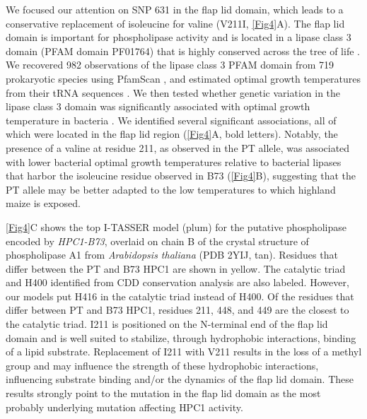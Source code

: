 \documentclass[9pt,twocolumn,twoside,lineno]{biorxiv}
\begin{document}
We focused our attention on SNP 631 in the flap lid domain, which leads to a conservative replacement of isoleucine for valine (V211I, \cref{Fig4}A).  
The flap lid domain is important for phospholipase activity and is located in a lipase class 3 domain (PFAM domain PF01764) that is highly conserved across the tree of life \cite{Jensen2021-zm}. 
We recovered 982 observations of the lipase class 3 PFAM domain from 719 prokaryotic species using PfamScan \cite{Potter2018-tk, El-Gebali2019-pw}, and estimated optimal growth temperatures from their tRNA sequences \cite{Cimen2020-dm}.
We then tested whether genetic variation in the lipase class 3 domain was significantly associated with optimal growth temperature in bacteria \cite{Jensen2021-iv}. 
We identified several significant associations, all of which were located in the flap lid region (\cref{Fig4}A, bold letters).  
Notably, the presence of a valine at residue 211, as observed in the PT allele, was associated with lower bacterial optimal growth temperatures relative to bacterial lipases that harbor the isoleucine residue observed in B73 (\cref{Fig4}B), suggesting that the PT allele may be better adapted to the low temperatures to which highland maize is exposed.

\cref{Fig4}C shows the top I-TASSER model (plum) for the putative phospholipase encoded by \textit{HPC1-B73}, overlaid on chain B of the crystal structure of phospholipase A1 from \textit{Arabidopsis thaliana} (PDB 2YIJ, tan). 
Residues that differ between the PT and B73 HPC1 are shown in yellow. 
The catalytic triad and H400 identified from CDD conservation analysis are also labeled.
However, our models put H416 in the catalytic triad instead of H400. 
Of the residues that differ between PT and B73 HPC1, residues 211, 448, and 449 are the closest to the catalytic triad. 
I211 is positioned on the N-terminal end of the flap lid domain and is well suited to stabilize, through hydrophobic interactions, binding of a lipid substrate.
Replacement of I211 with V211 results in the loss of a methyl group and may influence the strength of these hydrophobic interactions, influencing substrate binding and/or the dynamics of the flap lid domain.
These results strongly point to the mutation in the flap lid domain as the most probably underlying mutation affecting HPC1 activity.
\end{document}
